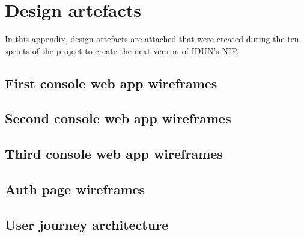 \chapter{Design artefacts}
\label{appendix5-design-artefacts}

In this appendix, design artefacts are attached that were created during the ten sprints of the project to create the next version of IDUN's NIP.

\section*{First console web app wireframes}

\section*{Second console web app wireframes}

\section*{Third console web app wireframes}


\section*{Auth page wireframes}

\section*{User journey architecture}
